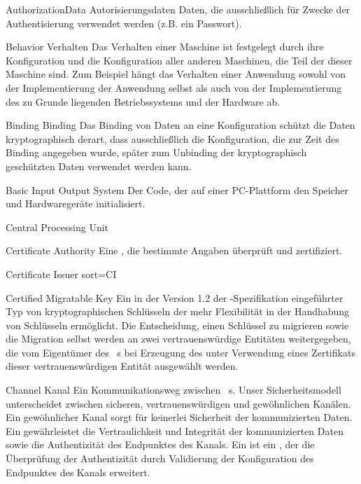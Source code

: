 \glosentry
          {AuthorizationData}
          {Autorisierungsdaten}
    {Daten, die ausschlie\ss{}lich f\"ur Zwecke der Authentisierung verwendet
     werden (z.B. ein Passwort).}

\glosentry
          {Behavior}
          {Verhalten}
    {Das Verhalten einer Maschine ist festgelegt durch ihre Konfiguration
     und die Konfiguration aller anderen Maschinen, die Teil der \TCB dieser
     Maschine sind. Zum Beispiel h\"angt das Verhalten einer Anwendung sowohl
     von der Implementierung der Anwendung selbst als auch von der
     Implementierung des zu Grunde liegenden Betriebssystems und der Hardware
     ab.}

\glosentry
          {Binding}
          {Binding}
    {Das Binding von Daten an eine Konfiguration sch\"utzt die Daten
    kryptographisch derart, dass ausschlie\ss{}lich die Konfiguration, die zur
    Zeit des Binding angegeben wurde, sp\"ater zum Unbinding der kryptographisch
    gesch\"utzten Daten verwendet werden kann.}

          {Basic Input Output System}
    {Der Code, der auf einer PC-Plattform den Speicher und Hardwareger\"ate
     initialisiert.}

     {Central Processing Unit}

          {Certificate Authority}
    {Eine \TrustedThirdParty, die bestimmte Angaben \"uberpr\"uft und zertifiziert.}

           {Certificate Issuer}
           {sort=CI}

          {Certified Migratable Key}
    {Ein in der Version 1.2 der \TCG-Spezifikation eingef\"uhrter Typ von
     kryptographischen Schl\"usseln der mehr Flexibilit\"at in der Handhabung
     von Schl\"usseln erm\"oglicht. Die Entscheidung, einen Schl\"ussel zu
     migrieren sowie die Migration selbst werden an zwei
     vertrauensw\"urdige Entit\"aten weitergegeben, die vom Eigent\"umer des \TPM~s
     bei Erzeugung des \CMK unter Verwendung eines Zertifikats dieser
     vertrauensw\"urdigen Entit\"at ausgew\"ahlt werden.}

\glosentry
          {Channel}
          {Kanal}
    {Ein Kommunikationsweg zwischen \Compartment~s. Unser Sicherheitsmodell
     unterscheidet zwischen sicheren, vertrauensw\"urdigen und gew\"ohnlichen
     Kan\"alen. Ein gew\"ohnlicher Kanal sorgt f\"ur keinerlei Sicherheit der
     kommunizierten Daten. Ein \SecureChannel gew\"ahrleistet die Vertraulichkeit
     und Integrit\"at der kommunizierten Daten sowie die Authentizit\"at des
     Endpunktes des Kanals. Ein \TrustedChannel ist ein \SecureChannel, der die
     \"Uberpr\"ufung der Authentizit\"at durch Validierung der Konfiguration des
     Endpunktes des Kanals erweitert.}

